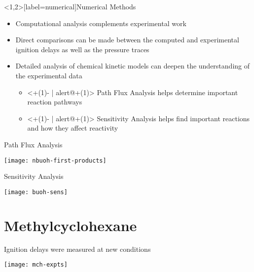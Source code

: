 \documentclass{beamer}
\begin{document}
\begin{frame}<1,2>[label=numerical]{Numerical Methods}
    \begin{itemize}
        \item Computational analysis complements experimental work
        \item Direct comparisons can be made between the computed and experimental
            ignition delays as well as the pressure traces
        \item Detailed analysis of chemical kinetic models can deepen the
            understanding of the experimental data
            \begin{itemize}
                \item<+(1)- | alert@+(1)> Path Flux Analysis helps determine important reaction pathways
                \item<+(1)- | alert@+(1)> Sensitivity Analysis helps find important reactions and how they affect reactivity
            \end{itemize}
    \end{itemize}
\end{frame}

\begin{frame}{Path Flux Analysis}
    \begin{center}
        \texttt{[image: nbuoh-first-products]}
    \end{center}
\end{frame}


\begin{frame}{Sensitivity Analysis}
    \begin{center}
        \texttt{[image: buoh-sens]}
    \end{center}
\end{frame}

\section{Methylcyclohexane}

\begin{frame}{Ignition delays were measured at new conditions}
    \begin{center}
        \texttt{[image: mch-expts]}
    \end{center}
\end{frame}
\end{document}
